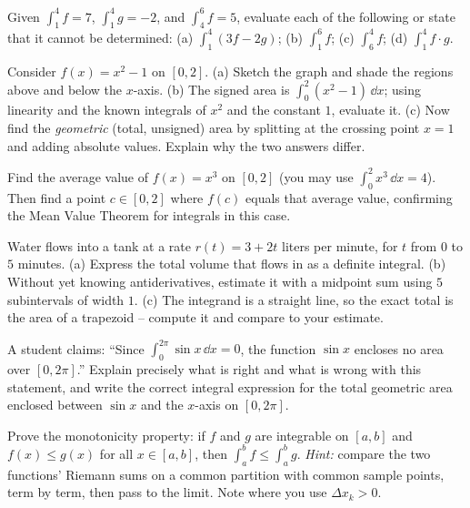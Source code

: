 \begin{exercise}
Given $\int_1^4 f = 7$, $\int_1^4 g = -2$, and $\int_4^6 f = 5$, evaluate each of
the following or state that it cannot be determined:
(a) $\int_1^4 (3f - 2g)$;\quad
(b) $\int_1^6 f$;\quad
(c) $\int_6^4 f$;\quad
(d) $\int_1^4 f\cdot g$.
\end{exercise}

\begin{exercise}
Consider $f(x) = x^2 - 1$ on $[0,2]$. (a) Sketch the graph and shade the regions
above and below the $x$-axis. (b) The signed area is $\int_0^2 (x^2-1)\,\dd x$;
using linearity and the known integrals of $x^2$ and the constant $1$, evaluate
it. (c) Now find the \emph{geometric} (total, unsigned) area by splitting at the
crossing point $x=1$ and adding absolute values. Explain why the two answers
differ.
\end{exercise}

\begin{exercise}
Find the average value of $f(x) = x^3$ on $[0,2]$ (you may use
$\int_0^2 x^3\,\dd x = 4$). Then find a point $c \in [0,2]$ where $f(c)$ equals
that average value, confirming the Mean Value Theorem for integrals in this case.
\end{exercise}

\begin{exercise}
Water flows into a tank at a rate $r(t) = 3 + 2t$ liters per minute, for $t$ from
$0$ to $5$ minutes. (a) Express the total volume that flows in as a definite
integral. (b) Without yet knowing antiderivatives, estimate it with a midpoint
sum using $5$ subintervals of width $1$. (c) The integrand is a straight line, so
the exact total is the area of a trapezoid -- compute it and compare to your
estimate.
\end{exercise}

\begin{exercise}
A student claims: ``Since $\int_0^{2\pi}\sin x\,\dd x = 0$, the function $\sin x$
encloses no area over $[0,2\pi]$.'' Explain precisely what is right and what is
wrong with this statement, and write the correct integral expression for the
total geometric area enclosed between $\sin x$ and the $x$-axis on $[0,2\pi]$.
\end{exercise}

\begin{exercise}
Prove the monotonicity property: if $f$ and $g$ are integrable on $[a,b]$ and
$f(x) \le g(x)$ for all $x \in [a,b]$, then $\int_a^b f \le \int_a^b g$.
\emph{Hint:} compare the two functions' Riemann sums on a common partition with
common sample points, term by term, then pass to the limit. Note where you use
$\Delta x_k > 0$.
\end{exercise}

